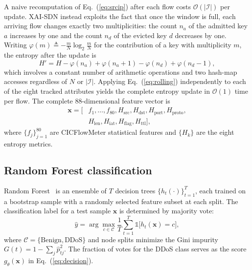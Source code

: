 ﻿\documentclass[review,12pt]{elsarticle}
\begin{document}
A naive recomputation of Eq.~(\ref{eq:srcip}) after each flow costs $\mathcal{O}(|\mathcal{I}|)$ per update. XAI-SDN instead exploits the fact that once the window is full, each arriving flow changes exactly two multiplicities: the count $n_a$ of the admitted key $a$ increases by one and the count $n_d$ of the evicted key $d$ decreases by one. Writing $\varphi(m) \triangleq -\frac{m}{N}\log_2\frac{m}{N}$ for the contribution of a key with multiplicity $m$, the entropy after the update is
\begin{equation}
H' = H - \varphi(n_a) + \varphi(n_a{+}1) - \varphi(n_d) + \varphi(n_d{-}1),
\label{eq:rolling}
\end{equation}
which involves a constant number of arithmetic operations and two hash-map accesses regardless of $N$ or $|\mathcal{I}|$. Applying Eq.~(\ref{eq:rolling}) independently to each of the eight tracked attributes yields the complete entropy update in $\mathcal{O}(1)$ time per flow. The complete 88-dimensional feature vector is
\begin{equation}
\begin{aligned}
\mathbf{x} = \bigl[ &f_1, \ldots, f_{80}, H_{\mathrm{src}}, H_{\mathrm{dst}}, H_{\mathrm{port}}, H_{\mathrm{proto}}, \\
&H_{\mathrm{len}}, H_{\mathrm{iat}}, H_{\mathrm{flag}}, H_{\mathrm{ttl}} \bigr],
\end{aligned}
\label{eq:fvec}
\end{equation}
where $\{f_j\}_{j=1}^{80}$ are CICFlowMeter statistical features and $\{H_k\}$ are the eight entropy metrics.

\subsection{Random Forest classification}
Random Forest~\cite{breiman2001rf} is an ensemble of $T$ decision trees $\{h_t(\cdot)\}_{t=1}^{T}$, each trained on a bootstrap sample with a randomly selected feature subset at each split. The classification label for a test sample $\mathbf{x}$ is determined by majority vote:
\begin{equation}
\hat{y} = \arg\max_{c \in \mathcal{C}} \frac{1}{T} \sum_{t=1}^{T} \mathbb{1}\bigl[h_t(\mathbf{x}) = c\bigr],
\label{eq:rfpred}
\end{equation}
where $\mathcal{C} = \{\text{Benign}, \text{DDoS}\}$ and node splits minimize the Gini impurity $G(t) = 1 - \sum_{j} \hat{p}_{tj}^{2}$. The fraction of votes for the DDoS class serves as the score $g_{\theta}(\mathbf{x})$ in Eq.~(\ref{eq:decision}).
\end{document}
